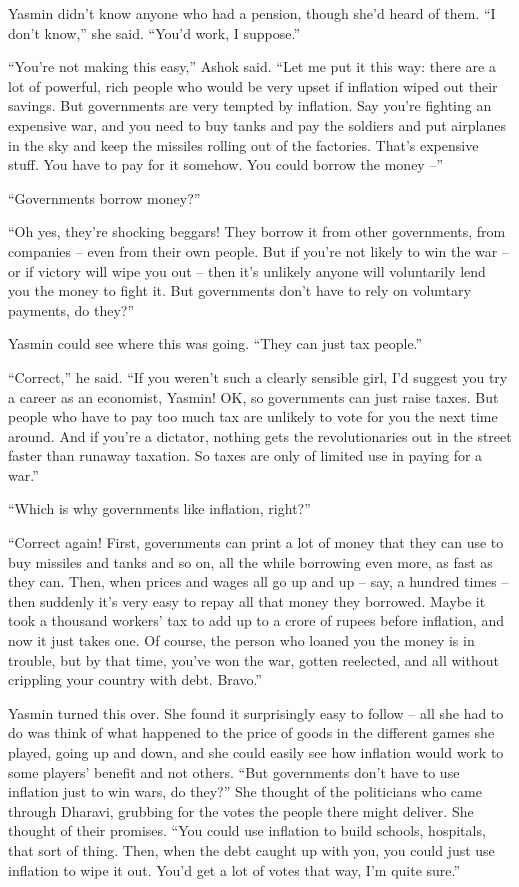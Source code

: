 Yasmin didn't know anyone who had a pension, though she'd heard of
them. ``I don't know,'' she said. ``You'd work, I suppose.''

``You're not making this easy,'' Ashok said. ``Let me put it this way:
there are a lot of powerful, rich people who would be very upset if
inflation wiped out their savings. But governments are very tempted
by inflation. Say you're fighting an expensive war, and you need to
buy tanks and pay the soldiers and put airplanes in the sky and
keep the missiles rolling out of the factories. That's expensive
stuff. You have to pay for it somehow. You could borrow the money
--''

``Governments borrow money?''

``Oh yes, they're shocking beggars! They borrow it from other
governments, from companies -- even from their own people. But if
you're not likely to win the war -- or if victory will wipe you out
-- then it's unlikely anyone will voluntarily lend you the money to
fight it. But governments don't have to rely on voluntary payments,
do they?''

Yasmin could see where this was going. ``They can just tax people.''

``Correct,'' he said. ``If you weren't such a clearly sensible girl,
I'd suggest you try a career as an economist, Yasmin! OK, so
governments can just raise taxes. But people who have to pay too
much tax are unlikely to vote for you the next time around. And if
you're a dictator, nothing gets the revolutionaries out in the
street faster than runaway taxation. So taxes are only of limited
use in paying for a war.''

``Which is why governments like inflation, right?''

``Correct again! First, governments can print a lot of money that
they can use to buy missiles and tanks and so on, all the while
borrowing even more, as fast as they can. Then, when prices and
wages all go up and up -- say, a hundred times -- then suddenly
it's very easy to repay all that money they borrowed. Maybe it took
a thousand workers' tax to add up to a crore of rupees before
inflation, and now it just takes one. Of course, the person who
loaned you the money is in trouble, but by that time, you've won
the war, gotten reelected, and all without crippling your country
with debt. Bravo.''

Yasmin turned this over. She found it surprisingly easy to follow
-- all she had to do was think of what happened to the price of
goods in the different games she played, going up and down, and she
could easily see how inflation would work to some players' benefit
and not others. ``But governments don't have to use inflation just
to win wars, do they?'' She thought of the politicians who came
through Dharavi, grubbing for the votes the people there might
deliver. She thought of their promises. ``You could use inflation to
build schools, hospitals, that sort of thing. Then, when the debt
caught up with you, you could just use inflation to wipe it out.
You'd get a lot of votes that way, I'm quite sure.''

